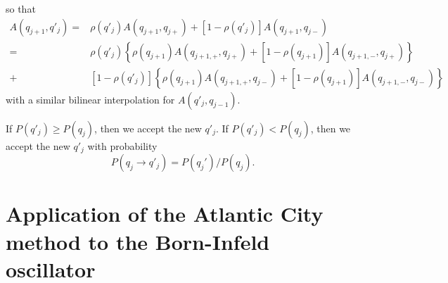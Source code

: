 \documentclass[prd,preprint,floatfix,showpacs]{revtex4-1}
\begin{document}
so that
\begin{equation}
   \begin{split}
A(q_{j+1}, q'_j) = {} & \rho(q'_j)  A(q_{j+1}, q_{j+})
+ \left[ 1 - \rho(q'_j) \right] A(q_{j+1}, q_{j-}) 
\\
= {}& \rho(q'_j) 
\left\{ \rho(q_{j+1}) 
A(q_{j+1,+}, q_{j+}) + \left[ 1 - \rho(q_{j+1}) \right]
A(q_{j+1,-}, q_{j+}) \right\}
\\
+{}& \left[ 1 - \rho(q'_j) \right]
\left\{ \rho(q_{j+1})
A(q_{j+1,+}, q_{j-}) +
\left[ 1 - \rho(q_{j+1}) \right]
A(q_{j+1,-}, q_{j-}) \right\}  
\label {we interpolate and use the value}
   \end{split}
\end{equation}
with a similar bilinear interpolation for \( A(q'_{j}, q_{j-1}) \)\@.
\par
If \( P(q'_j) \ge P(q_j) \), then we accept
the new  \( q'_j \)\@.
If \( P(q'_j) < P(q_j) \), then we 
accept the new  \( q'_j \) with probability
\begin{equation}
P(q_j \to q'_j) = P(q_j')/P(q_j) .
 \label {probability distribution 2}
\end{equation}

\section{Application of the Atlantic City method to the  Born-Infeld oscillator
\label {Application of the Atlantic City method to the 
Born-Infeld oscillator}}
\end{document}
